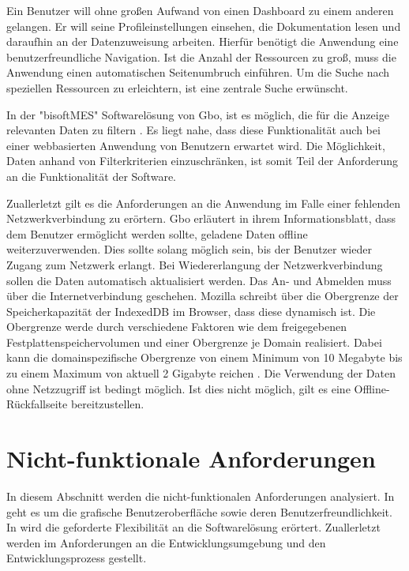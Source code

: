 Ein Benutzer will ohne großen Aufwand von einen Dashboard zu einem anderen gelangen. Er will seine Profileinstellungen
einsehen, die Dokumentation lesen und daraufhin an der Datenzuweisung arbeiten.
Hierfür benötigt die Anwendung eine benutzerfreundliche Navigation. Ist die Anzahl der Ressourcen zu 
groß, muss die Anwendung einen automatischen Seitenumbruch einführen. Um die Suche nach speziellen
Ressourcen zu erleichtern, ist eine zentrale Suche erwünscht.

In der "bisoftMES" Softwarelösung von Gbo, ist es möglich, die für die Anzeige relevanten Daten zu filtern \cite[S. 14]{BisoftMESHandbuch}.
Es liegt nahe, dass diese Funktionalität auch bei einer webbasierten Anwendung von Benutzern erwartet wird. Die Möglichkeit, Daten
anhand von Filterkriterien einzuschränken, ist somit Teil der Anforderung an die Funktionalität der Software.

Zuallerletzt gilt es die Anforderungen an die Anwendung im Falle einer fehlenden Netzwerkverbindung
zu erörtern. Gbo erläutert in ihrem Informationsblatt, dass dem Benutzer
ermöglicht werden sollte, geladene Daten offline weiterzuverwenden. Dies sollte solang möglich sein,
bis der Benutzer wieder Zugang zum Netzwerk erlangt. Bei Wiedererlangung der Netzwerkverbindung sollen
die Daten automatisch aktualisiert werden. Das An- und Abmelden muss über die Internetverbindung
geschehen. Mozilla schreibt über die Obergrenze der Speicherkapazität der IndexedDB im Browser,
dass diese dynamisch ist. Die Obergrenze werde durch verschiedene Faktoren wie dem freigegebenen
Festplattenspeichervolumen und einer Obergrenze je Domain realisiert. Dabei kann die domainspezifische
Obergrenze von einem Minimum von 10 Megabyte bis zu einem Maximum von aktuell 2 Gigabyte reichen \cite{MozillaStorageLimit}.
Die Verwendung der Daten ohne Netzzugriff ist bedingt möglich. Ist dies nicht möglich, gilt es
eine Offline-Rückfallseite bereitzustellen.

\section{Nicht-funktionale Anforderungen}
\label{sec:nichtfunktionaleanforderungen}
In diesem Abschnitt werden die nicht-funktionalen Anforderungen analysiert.
In  geht es um die grafische Benutzeroberfläche sowie
deren Benutzerfreundlichkeit. In  wird die geforderte
Flexibilität an die Softwarelösung erörtert. Zuallerletzt werden im 
Anforderungen an die Entwicklungsumgebung und den Entwicklungsprozess gestellt.

